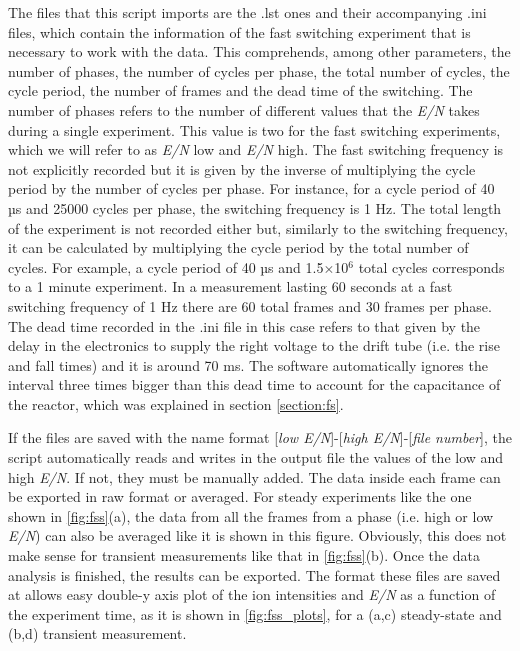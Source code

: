The files that this script imports are the .lst ones and their accompanying .ini files, which contain the information of the fast switching experiment that is necessary to work with the data.
This  comprehends, among other parameters,
the number of phases,
the number of cycles per phase,
the total number of cycles,
the cycle period,
the number of frames
and
the dead time of the switching.
The number of phases refers to the number of different values that the \textit{E/N} takes during a single experiment. This value is two for the fast switching experiments, which we will refer to as \textit{E/N} low  and \textit{E/N} high.
%
The fast switching frequency is not explicitly recorded but it is given by the inverse of multiplying the cycle period by the number of cycles per phase. For instance, for a cycle period of 40 µs and 25000 cycles per phase, the switching frequency is 1 Hz.
%
The total length of the experiment is not recorded either but, similarly to the switching frequency, it can be calculated by multiplying the cycle period by the total number of cycles. For example, a cycle period of 40 µs and 1.5$\times$10$^6$ total cycles corresponds to a 1 minute experiment.
%
%
In a measurement lasting 60 seconds at a fast switching frequency of 1 Hz there are 60 total frames and 30 frames per phase.
%
%
The dead time recorded in the .ini file in this case refers to that given by the delay in the electronics to supply the right voltage to the drift tube (i.e. the rise and fall times) and it is around 70 ms. The software automatically ignores the interval three times bigger than this dead time to account for the capacitance of the reactor, which was explained  in section \ref{section:fs}.




If the files are saved with the name format [\textit{low E/N}]-[\textit{high E/N}]-[\textit{file number}], the script automatically reads and writes in the output file the values of the low and high \textit{E/N}. If not, they must be manually added.
%
The data inside each frame can be exported in raw format or averaged.
For steady experiments like the one shown in \autoref{fig:fss}(a), the data from all the frames from a phase (i.e. high or low \textit{E/N}) can also be averaged like it is shown in this figure. Obviously, this does not make sense for transient measurements like that in \autoref{fig:fss}(b).
%
Once the data analysis is finished, the results can be exported. The format these files are saved at allows easy double-y axis plot of the ion intensities and \textit{E/N} as a function of the experiment time, as it is shown in \autoref{fig:fss_plots}, for a (a,c) steady-state  and (b,d) transient measurement.




